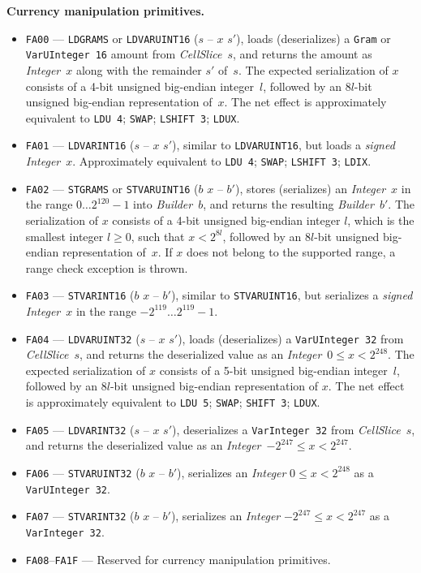 \documentclass[12pt,oneside]{article}
\def\makepoint#1{\medbreak\noindent{\bf #1.\ }}
\def\nxsubpoint{\refstepcounter{subsubsection}%
  \smallbreak\makepoint{\thesubsubsection}}
\def\emb#1{\textbf{#1.}}
\begin{document}
\nxsubpoint\emb{Currency manipulation primitives}
\begin{itemize}
\item {\tt FA00} --- {\tt LDGRAMS} or {\tt LDVARUINT16} ($s$ -- $x$ $s'$), loads (deserializes) a {\tt Gram\/} or {\tt VarUInteger 16} amount from {\em CellSlice\/}~$s$, and returns the amount as {\em Integer\/}~$x$ along with the remainder $s'$ of~$s$. The expected serialization of $x$ consists of a 4-bit unsigned big-endian integer~$l$, followed by an $8l$-bit unsigned big-endian representation of~$x$. The net effect is approximately equivalent to {\tt LDU 4}; {\tt SWAP}; {\tt LSHIFT 3}; {\tt LDUX}.
\item {\tt FA01} --- {\tt LDVARINT16} ($s$ -- $x$ $s'$), similar to {\tt LDVARUINT16}, but loads a {\em signed\/} {\em Integer\/}~$x$. Approximately equivalent to {\tt LDU 4}; {\tt SWAP}; {\tt LSHIFT 3}; {\tt LDIX}.
\item {\tt FA02} --- {\tt STGRAMS} or {\tt STVARUINT16} ($b$ $x$ -- $b'$), stores (serializes) an {\em Integer\/}~$x$ in the range $0\ldots2^{120}-1$ into {\em Builder\/}~$b$, and returns the resulting {\em Builder\/}~$b'$. The serialization of $x$ consists of a 4-bit unsigned big-endian integer $l$, which is the smallest integer $l\geq0$, such that $x<2^{8l}$, followed by an $8l$-bit unsigned big-endian representation of~$x$. If $x$ does not belong to the supported range, a range check exception is thrown.
\item {\tt FA03} --- {\tt STVARINT16} ($b$ $x$ -- $b'$), similar to {\tt STVARUINT16}, but serializes a {\em signed\/} {\em Integer\/}~$x$ in the range $-2^{119}\ldots2^{119}-1$.
\item {\tt FA04} --- {\tt LDVARUINT32} ($s$ -- $x$ $s'$), loads (deserializes) a {\tt VarUInteger 32} from {\em CellSlice\/}~$s$, and returns the deserialized value as an {\em Integer\/}~$0\leq x<2^{248}$. The expected serialization of $x$ consists of a 5-bit unsigned big-endian integer~$l$, followed by an $8l$-bit unsigned big-endian representation of $x$. The net effect is approximately equivalent to {\tt LDU 5}; {\tt SWAP}; {\tt SHIFT 3}; {\tt LDUX}.
\item {\tt FA05} --- {\tt LDVARINT32} ($s$ -- $x$ $s'$), deserializes a {\tt VarInteger 32} from {\em CellSlice\/}~$s$, and returns the deserialized value as an {\em Integer\/}~$-2^{247}\leq x<2^{247}$.
\item {\tt FA06} --- {\tt STVARUINT32} ($b$ $x$ -- $b'$), serializes an {\em Integer\/} $0\leq x<2^{248}$ as a {\tt VarUInteger 32}.
\item {\tt FA07} --- {\tt STVARINT32} ($b$ $x$ -- $b'$), serializes an {\em Integer\/} $-2^{247}\leq x<2^{247}$ as a {\tt VarInteger 32}.
\item {\tt FA08}--{\tt FA1F} --- Reserved for currency manipulation primitives.
\end{itemize}
\end{document}
